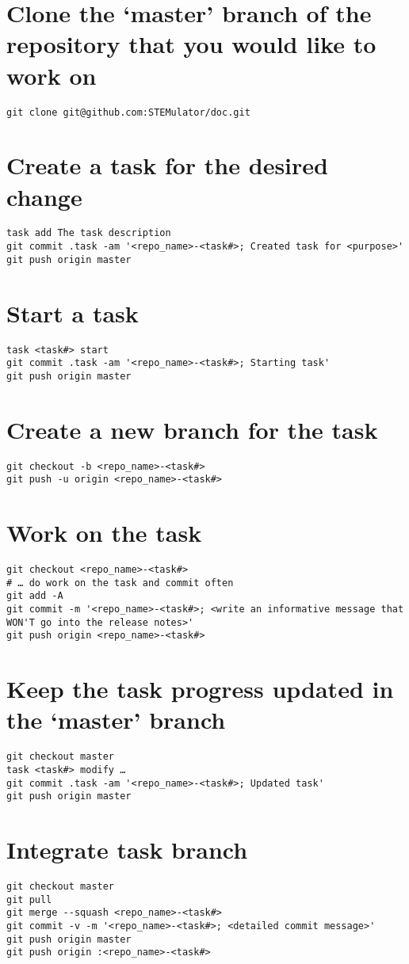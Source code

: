 \documentclass[12pt]{article}
\begin{document}
\section{Clone the ‘master’ branch of the repository that you would like to work on}
\begin{lstlisting}
git clone git@github.com:STEMulator/doc.git
\end{lstlisting}

\section*{Create a task for the desired change}
\begin{lstlisting}
task add The task description
git commit .task -am '<repo_name>-<task#>; Created task for <purpose>'
git push origin master
\end{lstlisting}

\section*{Start a task}
\begin{lstlisting}
task <task#> start
git commit .task -am '<repo_name>-<task#>; Starting task'
git push origin master
\end{lstlisting}

\section*{Create a new branch for the task}
\begin{lstlisting}
git checkout -b <repo_name>-<task#>
git push -u origin <repo_name>-<task#>
\end{lstlisting}

\section*{Work on the task}
\begin{lstlisting}
git checkout <repo_name>-<task#>
# … do work on the task and commit often
git add -A
git commit -m '<repo_name>-<task#>; <write an informative message that WON'T go into the release notes>'
git push origin <repo_name>-<task#>
\end{lstlisting}

\section*{Keep the task progress updated in the ‘master’ branch}
\begin{lstlisting}
git checkout master
task <task#> modify …
git commit .task -am '<repo_name>-<task#>; Updated task'
git push origin master
\end{lstlisting}

\section*{Integrate task branch}
\begin{lstlisting}
git checkout master
git pull
git merge --squash <repo_name>-<task#>
git commit -v -m '<repo_name>-<task#>; <detailed commit message>'
git push origin master
git push origin :<repo_name>-<task#>
\end{lstlisting}
\end{document}
